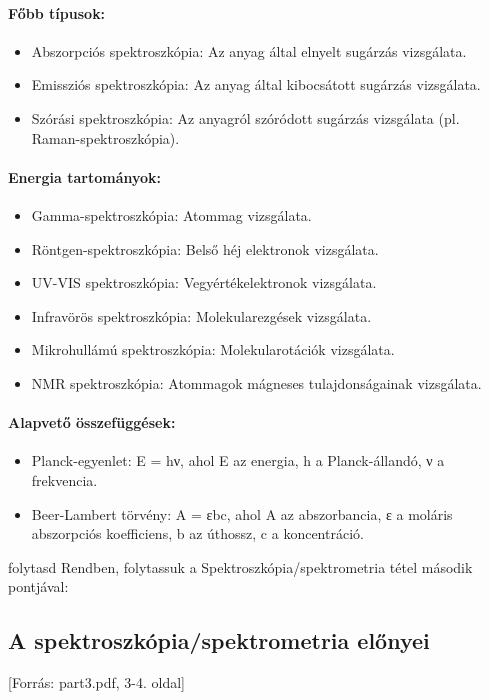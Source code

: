 \documentclass[a4paper,12pt]{article}
\begin{document}
\paragraph{Főbb típusok:} \begin{itemize} \item Abszorpciós spektroszkópia: Az anyag által elnyelt sugárzás vizsgálata. \item Emissziós spektroszkópia: Az anyag által kibocsátott sugárzás vizsgálata. \item Szórási spektroszkópia: Az anyagról szóródott sugárzás vizsgálata (pl. Raman-spektroszkópia). \end{itemize}

\paragraph{Energia tartományok:} \begin{itemize} \item Gamma-spektroszkópia: Atommag vizsgálata. \item Röntgen-spektroszkópia: Belső héj elektronok vizsgálata. \item UV-VIS spektroszkópia: Vegyértékelektronok vizsgálata. \item Infravörös spektroszkópia: Molekularezgések vizsgálata. \item Mikrohullámú spektroszkópia: Molekularotációk vizsgálata. \item NMR spektroszkópia: Atommagok mágneses tulajdonságainak vizsgálata. \end{itemize}

\paragraph{Alapvető összefüggések:} \begin{itemize} \item Planck-egyenlet: E = hν, ahol E az energia, h a Planck-állandó, ν a frekvencia. \item Beer-Lambert törvény: A = εbc, ahol A az abszorbancia, ε a moláris abszorpciós koefficiens, b az úthossz, c a koncentráció. \end{itemize}

folytasd
Rendben, folytassuk a Spektroszkópia/spektrometria tétel második pontjával:

\subsection{A spektroszkópia/spektrometria előnyei} [Forrás: part3.pdf, 3-4. oldal]
\end{document}
